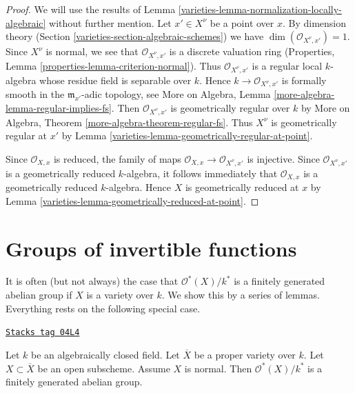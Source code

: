 \begin{proof}

We will use the results of Lemma \ref{varieties-lemma-normalization-locally-algebraic}
without further mention. Let $x' \in X^\nu$ be a point over $x$.
By dimension theory (Section \ref{varieties-section-algebraic-schemes}) we have
$\dim(\mathcal{O}_{X^\nu, x'}) = 1$. Since $X^\nu$ is normal, we
see that $\mathcal{O}_{X^\nu, x'}$ is a discrete valuation ring
(Properties, Lemma \ref{properties-lemma-criterion-normal}).
Thus $\mathcal{O}_{X^\nu, x'}$ is a regular local $k$-algebra
whose residue field is separable over $k$. Hence
$k \to \mathcal{O}_{X^\nu, x'}$ is formally smooth
in the $\mathfrak m_{x'}$-adic topology, see
More on Algebra, Lemma \ref{more-algebra-lemma-regular-implies-fs}.
Then $\mathcal{O}_{X^\nu, x'}$ is geometrically regular
over $k$ by
More on Algebra, Theorem \ref{more-algebra-theorem-regular-fs}.
Thus $X^\nu$ is geometrically regular at $x'$ by
Lemma \ref{varieties-lemma-geometrically-regular-at-point}.

\medskip\noindent
Since $\mathcal{O}_{X, x}$ is reduced, the family of maps
$\mathcal{O}_{X, x} \to \mathcal{O}_{X^\nu, x'}$ is injective.
Since $\mathcal{O}_{X^\nu, x'}$ is a geometrically reduced
$k$-algebra, it follows immediately that $\mathcal{O}_{X, x}$
is a geometrically reduced $k$-algebra. Hence $X$ is geometrically
reduced at $x$ by Lemma \ref{varieties-lemma-geometrically-reduced-at-point}.
\end{proof}

\section{Groups of invertible functions}
\label{varieties-section-units}
It is often (but not always) the case that $\mathcal{O}^*(X)/k^*$
is a finitely generated abelian group if $X$ is a variety over $k$.
We show this by a series of lemmas.
Everything rests on the following special case.

\begin{lemma}
\label{varieties-lemma-open-in-normal-proper}
\href{https://stacks.math.columbia.edu/tag/04L4}{\texttt{Stacks tag 04L4}}

Let $k$ be an algebraically closed field.
Let $\overline{X}$ be a proper variety over $k$.
Let $X \subset \overline{X}$ be an open subscheme.
Assume $X$ is normal.
Then $\mathcal{O}^*(X)/k^*$ is a finitely generated abelian group.
\end{lemma}

